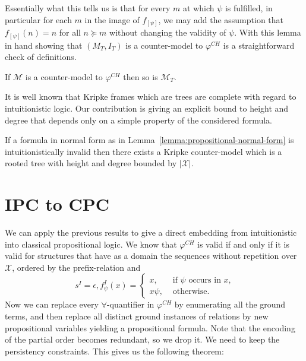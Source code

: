 \documentclass[runningheads]{llncs}
\begin{document}
Essentially what this tells us is that for every $m$ at which $\psi$ is fulfilled, in particular for each $m$ in the image of $f_{[\psi]}$, we may add the assumption that $f_{[\psi]}(n) = n$ for all $n\succeq m$ without changing the validity of $\psi$. With this lemma in hand showing that $(M_T, I_T)$ is a counter-model to $\varphi^{CH}$ is a straightforward check of definitions.

\begin{corollary}\label{cor:prop-tree-model}
	If $\mathcal M$ is a counter-model to $\varphi^{CH}$ then so is $\mathcal M_T$.
\end{corollary}

\begin{remark}
	It is well known that Kripke frames which are trees are complete with regard to intuitionistic logic. Our contribution is giving an explicit bound to height and degree that depends only on a simple property of the considered formula.
\end{remark}

\begin{corollary}
	If a formula in normal form as in Lemma~\ref{lemma:propositional-normal-form} is intuitionistically invalid then there exists a Kripke counter-model which is a rooted tree with height and degree bounded by $|\mathcal X|$.
\end{corollary}

\section{IPC to CPC}

We can apply the previous results to give a direct embedding from intuitionistic into classical propositional logic. We know that $\varphi^{CH}$ is valid if and only if it is valid for structures that have as a domain the sequences without repetition over $\mathcal X$, ordered by the prefix-relation and $$s^I = \epsilon, f_\psi^I(x) = \begin{cases}
	x, &\text{ if $\psi$ occurs in $x$,}\\
	x\psi, &\text{ otherwise.}
\end{cases}$$
Now we can replace every $\forall$-quantifier in $\varphi^{CH}$ by enumerating all the ground terms, and then replace all distinct ground instances of relations by new propositional variables yielding a propositional formula. Note that the encoding of the partial order becomes redundant, so we drop it. We need to keep the persistency constraints. This gives us the following theorem:
\end{document}
